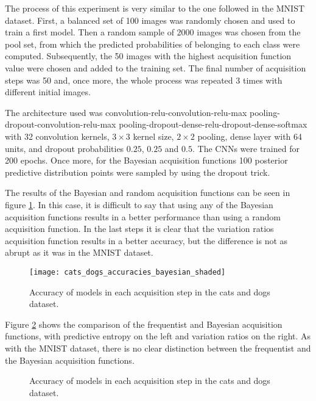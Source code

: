 The process of this experiment is very similar to the one followed in the MNIST dataset. First, a balanced set of 100 images was randomly chosen and used to train a first model. Then a random sample of 2000 images was chosen from the pool set, from which the predicted probabilities of belonging to each class were computed. Subsequently, the 50 images with the highest acquisition function value were chosen and added to the training set. The final number of acquisition steps was 50 and, once more, the whole process was repeated 3 times with different initial images.

The architecture used was convolution-relu-convolution-relu-max pooling-dropout-convolution-relu-max pooling-dropout-dense-relu-dropout-dense-softmax with 32 convolution kernels, $3 \times 3$ kernel size, $2 \times 2$ pooling, dense layer with 64 units, and dropout probabilities $0.25$, $0.25$ and $0.5$. The CNNs were trained for 200 epochs. Once more, for the Bayesian acquisition functions 100 posterior predictive distribution points were sampled by using the dropout trick.

The results of the Bayesian and random acquisition functions can be seen in figure \ref{fig:cats_dogs_accuracies_bayesian}. In this case, it is difficult to say that using any of the Bayesian acquisition functions results in a better performance than using a random acquisition function. In the last steps it is clear that the variation ratios acquisition function results in a better accuracy, but the difference is not as abrupt as it was in the MNIST dataset.

\begin{figure}[H]
    \centering
    \texttt{[image: cats\_dogs\_accuracies\_bayesian\_shaded]}
    \caption{Accuracy of models in each acquisition step in the cats and dogs dataset.}
    \label{fig:cats_dogs_accuracies_bayesian}
\end{figure}

Figure \ref{fig:cats_dogs_bayesian_vs_freq} shows the comparison of the frequentist and Bayesian acquisition functions, with predictive entropy on the left and variation ratios on the right. As with the MNIST dataset, there is no clear distinction between the frequentist and the Bayesian acquisition functions.

\begin{figure}[H]
    \centering
    \hfill
    \caption{Accuracy of models in each acquisition step in the cats and dogs dataset.}
    \label{fig:cats_dogs_bayesian_vs_freq}
\end{figure}




